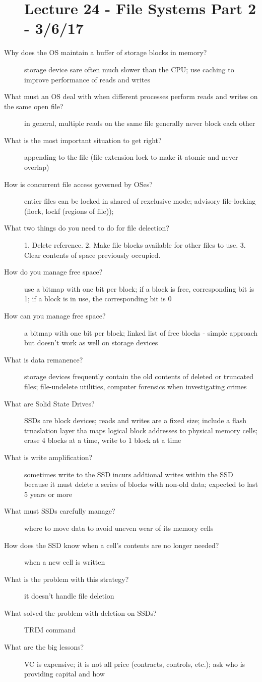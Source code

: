\documentclass[10pt]{article}
\begin{document}
\begin{description}
\section{Lecture 24 - File Systems Part 2 - 3/6/17}
\item[Why does the OS maintain a buffer of storage blocks in memory?]
  storage device sare often much slower than the CPU; use caching to improve performance of reads and writes
\item[What must an OS deal with when different processes perform reads and writes on the same open file?]
  in general, multiple reads on the same file generally never block each other
\item[What is the most important situation to get right?]
  appending to the file (file extension lock to make it atomic and never overlap)
\item[How is concurrent file access governed by OSes?]
  entier files can be locked in shared of rexclusive mode;
  advisory file-locking (flock, lockf (regions of file));
\item[What two things do you need to do for file delection?]
  1. Delete reference.
  2. Make file blocks available for other files to use.
  3. Clear contents of space previously occupied.
\item[How do you manage free space?]
  use a bitmap with one bit per block;
  if a block is free, corresponding bit is 1;
  if a block is in use, the corresponding bit is 0
\item[How can you manage free space?]
  a bitmap with one bit per block;
  linked list of free blocks - simple approach but doesn't work as well on storage devices
\item[What is data remanence?]
  storage devices frequently contain the old contents of deleted or truncated files;
  file-undelete utilities, computer forensics when investigating crimes
\item[What are Solid State Drives?]
  SSDs are block devices; reads and writes are a fixed size;
  include a flash trnaslation layer tha maps logical block addresses to physical memory cells;
  erase 4 blocks at a time, write to 1 block at a time
\item[What is write amplification?]
  sometimes write to the SSD incurs addtional writes within the SSD because it must delete a series of blocks with non-old data;
  expected to last 5 years or more
\item[What must SSDs carefully manage?]
  where to move data to avoid uneven wear of its memory cells
\item[How does the SSD know when a cell's contents are no longer needed?]
  when a new cell is written
\item[What is the problem with this strategy?]
  it doesn't handle file deletion
\item[What solved the problem with deletion on SSDs?]
  TRIM command
\item[What are the big lessons?]
  VC is expensive;
  it is not all price (contracts, controls, etc.);
  ask who is providing capital and how
\end{description}
\end{document}
